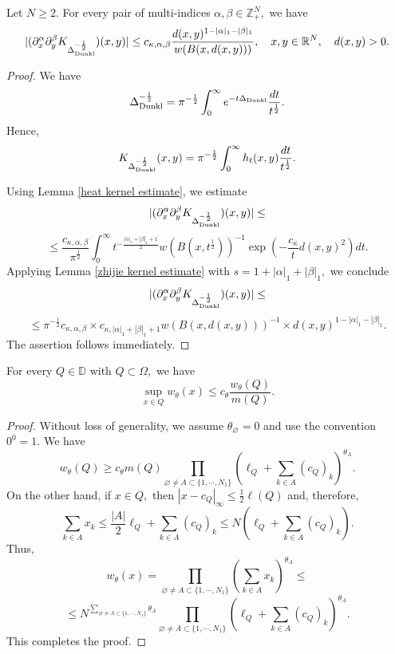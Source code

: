 \documentclass{amsart}
\begin{document}
\begin{lemma}\label{lem:Dunkl-Riesz-endpoint-derivatives} Let $N\geq2.$ For every pair of multi-indices $\alpha,\beta\in\mathbb{Z}^N_+,$ we have
$$|(\partial_x^{\alpha}\partial_y^{\beta}K_{\Delta_{{\rm Dunkl}}^{-\frac12}})(x,y)|
\leq c_{\kappa,\alpha,\beta}\frac{d(x,y)^{1-|\alpha|_1-|\beta|_1}}{w(B(x,d(x,y)))},\quad x,y\in\mathbb{R}^N,\quad d(x,y)>0.$$
\end{lemma}
\begin{proof} We have
$$\Delta_{{\rm Dunkl}}^{-\frac12}=\pi^{-\frac12}\int_0^{\infty}e^{-t\Delta_{{\rm Dunkl}}}\frac{dt}{t^{\frac12}}.$$
Hence,
$$K_{\Delta_{{\rm Dunkl}}^{-\frac12}}(x,y)=\pi^{-\frac12}\int_0^{\infty}h_t(x,y)\frac{dt}{t^{\frac12}}.$$

Using Lemma \ref{heat kernel estimate}, we estimate
$$|(\partial_x^{\alpha}\partial_y^{\beta}K_{\Delta_{{\rm Dunkl}}^{-\frac12}})(x,y)|\leq$$
$$\leq \frac{c_{\kappa,\alpha,\beta}}{\pi^{\frac12}}\int_0^{\infty}t^{-\frac{|\alpha|_1+|\beta|_1+1}{2}}w(B(x,t^{\frac12}))^{-1}\exp(-\frac{c_{\kappa}}{t}d(x,y)^2)dt.$$
Applying Lemma \ref{zhijie kernel estimate} with $s=1+|\alpha|_1+|\beta|_1,$ we conclude
$$|(\partial_x^{\alpha}\partial_y^{\beta}K_{\Delta_{{\rm Dunkl}}^{-\frac12}})(x,y)|\leq$$
$$\leq \pi^{-\frac12}c_{\kappa,\alpha,\beta}\times c_{\kappa,|\alpha|_1+|\beta|_1+1}w(B(x,d(x,y)))^{-1}\times d(x,y)^{1-|\alpha|_1-|\beta|_1}.$$
The assertion follows immediately.
\end{proof}

\begin{lemma}\label{supremum vs average} For every $Q\in\mathbb{D}$ with $Q\subset\Omega,$ we have
$$\sup_{x\in Q}w_{\theta}(x)\leq c_{\theta}\frac{w_{\theta}(Q)}{m(Q)}.$$
\end{lemma}
\begin{proof} Without loss of generality, we assume $\theta_{\varnothing}=0$ and use the convention $0^0=1.$ We have
$$w_{\theta}(Q)\geq c_{\theta}m(Q)\prod_{\varnothing\neq A\subset\{1,\cdots,N_1\}}(\ell_Q+\sum_{k\in A}(c_Q)_k)^{\theta_A}.$$
On the other hand, if $x\in Q,$ then $|x-c_Q|_{\infty}\leq \frac12\ell(Q)$ and, therefore,
$$\sum_{k\in A}x_k\leq \frac{|A|}{2}\ell_Q+\sum_{k\in A}(c_Q)_k\leq N(\ell_Q+\sum_{k\in A}(c_Q)_k).$$
Thus,
$$w_{\theta}(x)=\prod_{\varnothing\neq A\subset\{1,\cdots,N_1\}}(\sum_{k\in A}x_k)^{\theta_A}\leq $$
$$\leq N^{\sum_{\varnothing\neq A\subset\{1,\cdots,N_1\}}\theta_A}\prod_{\varnothing\neq A\subset\{1,\cdots,N_1\}}(\ell_Q+\sum_{k\in A}(c_Q)_k)^{\theta_A}.$$
This completes the proof.
\end{proof}
\end{document}

